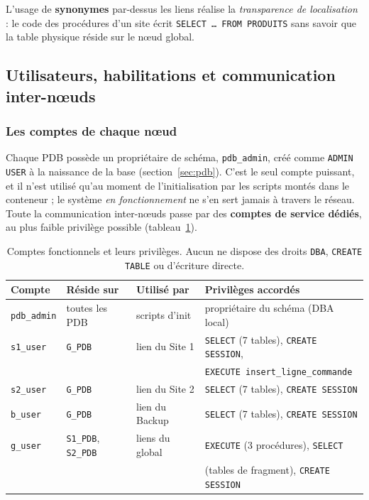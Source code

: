 \documentclass[11pt,a4paper]{article}
\begin{document}
L'usage de \textbf{synonymes} par-dessus les liens réalise la
\emph{transparence de localisation} : le code des procédures d'un site écrit
\texttt{SELECT \ldots\ FROM PRODUITS} sans savoir que la table physique réside
sur le nœud global.

\subsection{Utilisateurs, habilitations et communication inter-nœuds}
\label{sec:users}

\subsubsection*{Les comptes de chaque nœud}

Chaque PDB possède un propriétaire de schéma, \texttt{pdb\_admin}, créé comme
\texttt{ADMIN USER} à la naissance de la base (section~\ref{sec:pdb}). C'est le
seul compte puissant, et il n'est utilisé qu'au moment de l'initialisation par
les scripts montés dans le conteneur ; le système \emph{en fonctionnement} ne
s'en sert jamais à travers le réseau. Toute la communication inter-nœuds passe
par des \textbf{comptes de service dédiés}, au plus faible privilège possible
(tableau~\ref{tab:users}).

\begin{table}[h]
\centering
\begin{tabular}{@{}llll@{}}
\toprule
\textbf{Compte} & \textbf{Réside sur} & \textbf{Utilisé par} & \textbf{Privilèges accordés} \\
\midrule
\texttt{pdb\_admin} & toutes les PDB & scripts d'init & propriétaire du schéma (DBA local) \\
\texttt{s1\_user}   & \texttt{G\_PDB} & lien du Site 1 & \texttt{SELECT} (7 tables), \texttt{CREATE SESSION}, \\
                    &                 &                & \texttt{EXECUTE insert\_ligne\_commande} \\
\texttt{s2\_user}   & \texttt{G\_PDB} & lien du Site 2 & \texttt{SELECT} (7 tables), \texttt{CREATE SESSION} \\
\texttt{b\_user}    & \texttt{G\_PDB} & lien du Backup & \texttt{SELECT} (7 tables), \texttt{CREATE SESSION} \\
\texttt{g\_user}    & \texttt{S1\_PDB}, \texttt{S2\_PDB} & liens du global & \texttt{EXECUTE} (3 procédures), \texttt{SELECT} \\
                    &                 &                & (tables de fragment), \texttt{CREATE SESSION} \\
\bottomrule
\end{tabular}
\caption{Comptes fonctionnels et leurs privilèges. Aucun ne dispose des droits
\texttt{DBA}, \texttt{CREATE TABLE} ou d'écriture directe.}
\label{tab:users}
\end{table}
\end{document}
